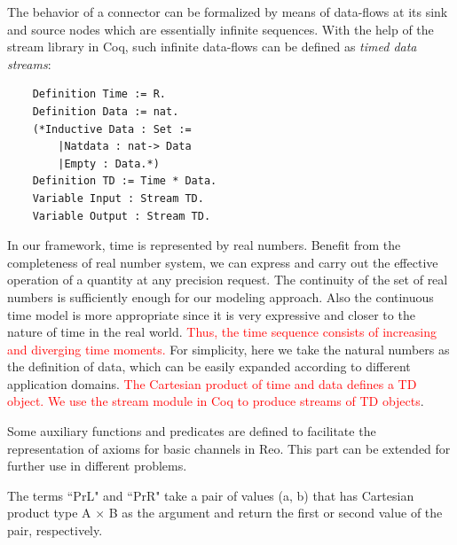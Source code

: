 \documentclass{llncs}
\newcommand{\redt}[1]{\textcolor{red}{#1}}
\begin{document}
The behavior of a connector can be formalized by means of data-flows at its sink and source nodes which are essentially infinite sequences. With the help of the stream library in Coq, such infinite data-flows can be defined as \emph{timed data streams}:
\begin{verbatim}
    Definition Time := R.
    Definition Data := nat.
    (*Inductive Data : Set :=
        |Natdata : nat-> Data
        |Empty : Data.*)
    Definition TD := Time * Data.
    Variable Input : Stream TD.
    Variable Output : Stream TD.
\end{verbatim}
%
In our framework, time is represented by real numbers. Benefit from the completeness of real number system, we can express and carry out the effective operation of a quantity at any precision request.
The continuity of the set of real numbers is sufficiently enough for our modeling approach. Also the
continuous time model is more appropriate since it is very expressive and closer to the nature of time in the real world. \redt{Thus, the time sequence consists of increasing and diverging time moments.} For simplicity, here we take the natural numbers as the definition of data, which can be easily expanded according to different application domains. \redt{The Cartesian product of time and data defines a TD object.
We use the stream module in Coq to produce streams of TD objects}.

Some auxiliary functions and predicates are defined to facilitate the representation of axioms for basic channels in Reo. This part can be extended for further use in different problems.

The terms ``PrL" and ``PrR" take a pair of values (a, b) that has Cartesian product type A $\times$ B as the argument and return the first or second value of the pair, respectively.
\end{document}
